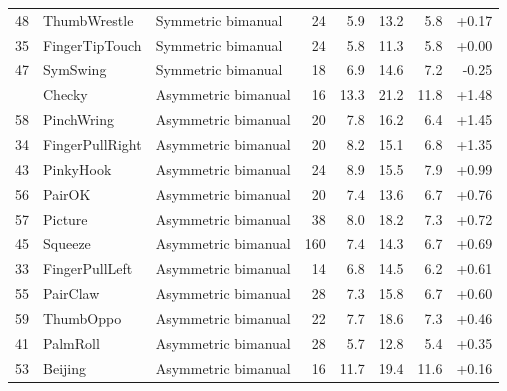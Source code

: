 \begin{table}[h]
\begin{tabular}{rllrrrrr}
48 & ThumbWrestle & Symmetric bimanual & 24 & 5.9 & 13.2 & 5.8 & +0.17 \\
35 & FingerTipTouch & Symmetric bimanual & 24 & 5.8 & 11.3 & 5.8 & +0.00 \\
47 & SymSwing & Symmetric bimanual & 18 & 6.9 & 14.6 & 7.2 & -0.25 \\
\addlinespace[3pt]
54 & Checky & Asymmetric bimanual & 16 & 13.3 & 21.2 & 11.8 & +1.48 \\
58 & PinchWring & Asymmetric bimanual & 20 & 7.8 & 16.2 & 6.4 & +1.45 \\
34 & FingerPullRight & Asymmetric bimanual & 20 & 8.2 & 15.1 & 6.8 & +1.35 \\
43 & PinkyHook & Asymmetric bimanual & 24 & 8.9 & 15.5 & 7.9 & +0.99 \\
56 & PairOK & Asymmetric bimanual & 20 & 7.4 & 13.6 & 6.7 & +0.76 \\
57 & Picture & Asymmetric bimanual & 38 & 8.0 & 18.2 & 7.3 & +0.72 \\
45 & Squeeze & Asymmetric bimanual & 160 & 7.4 & 14.3 & 6.7 & +0.69 \\
33 & FingerPullLeft & Asymmetric bimanual & 14 & 6.8 & 14.5 & 6.2 & +0.61 \\
55 & PairClaw & Asymmetric bimanual & 28 & 7.3 & 15.8 & 6.7 & +0.60 \\
59 & ThumbOppo & Asymmetric bimanual & 22 & 7.7 & 18.6 & 7.3 & +0.46 \\
41 & PalmRoll & Asymmetric bimanual & 28 & 5.7 & 12.8 & 5.4 & +0.35 \\
53 & Beijing & Asymmetric bimanual & 16 & 11.7 & 19.4 & 11.6 & +0.16 \\
\bottomrule
\end{tabular}
\end{table}